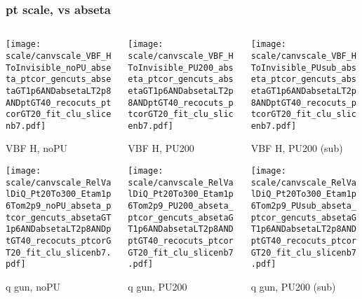 \documentclass[8pt]{beamer}
\begin{document}
  \begin{frame}
  \frametitle{pt scale, vs abseta}
  
  \begin{columns}
   \begin{column}{0.35\textwidth}
     \texttt{[image: scale/canvscale\_VBF\_HToInvisible\_noPU\_abseta\_ptcor\_gencuts\_absetaGT1p6ANDabsetaLT2p8ANDptGT40\_recocuts\_ptcorGT20\_fit\_clu\_slicenb7.pdf]}
     
     VBF H, noPU
    
     \texttt{[image: scale/canvscale\_RelValDiQ\_Pt20To300\_Etam1p6Tom2p9\_noPU\_abseta\_ptcor\_gencuts\_absetaGT1p6ANDabsetaLT2p8ANDptGT40\_recocuts\_ptcorGT20\_fit\_clu\_slicenb7.pdf]}
     
     q gun, noPU
   \end{column}
   \begin{column}{0.35\textwidth}
     \texttt{[image: scale/canvscale\_VBF\_HToInvisible\_PU200\_abseta\_ptcor\_gencuts\_absetaGT1p6ANDabsetaLT2p8ANDptGT40\_recocuts\_ptcorGT20\_fit\_clu\_slicenb7.pdf]}
     
     VBF H, PU200
    
     \texttt{[image: scale/canvscale\_RelValDiQ\_Pt20To300\_Etam1p6Tom2p9\_PU200\_abseta\_ptcor\_gencuts\_absetaGT1p6ANDabsetaLT2p8ANDptGT40\_recocuts\_ptcorGT20\_fit\_clu\_slicenb7.pdf]}
     
     q gun, PU200
   \end{column}
   \begin{column}{0.35\textwidth}
     \texttt{[image: scale/canvscale\_VBF\_HToInvisible\_PUsub\_abseta\_ptcor\_gencuts\_absetaGT1p6ANDabsetaLT2p8ANDptGT40\_recocuts\_ptcorGT20\_fit\_clu\_slicenb7.pdf]}
     
     VBF H, PU200 (sub)
    
     \texttt{[image: scale/canvscale\_RelValDiQ\_Pt20To300\_Etam1p6Tom2p9\_PUsub\_abseta\_ptcor\_gencuts\_absetaGT1p6ANDabsetaLT2p8ANDptGT40\_recocuts\_ptcorGT20\_fit\_clu\_slicenb7.pdf]}
     
     q gun, PU200 (sub)
   \end{column}
  \end{columns}
 \end{frame}
 
\end{document}
